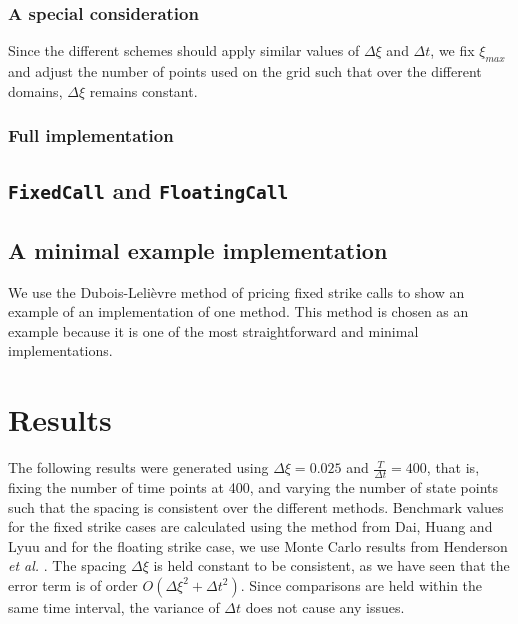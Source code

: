 \documentclass{article}
\begin{document}
\subsubsection{A special consideration}
Since the different schemes should apply similar values of \(\Delta\xi\) and \(\Delta t\), we fix \(\xi_{max}\) and adjust the number of points used on the grid such that over the different domains, \(\Delta\xi\) remains constant.

\subsubsection{Full implementation}
\scriptsize

\normalsize

\subsection{\texttt{FixedCall} and \texttt{FloatingCall}}

\scriptsize

\normalsize

\scriptsize

\normalsize

\subsection{A minimal example implementation}

We use the Dubois-Leli\`{e}vre method of pricing fixed strike calls to show an example of an implementation of one method. This method is chosen as an example because it is one of the most straightforward and minimal implementations.
\scriptsize

\normalsize

\section{Results}
The following results were generated using \(\Delta\xi = 0.025\) and \(\frac{T}{\Delta t} = 400\), that is, fixing the number of time points at 400, and varying the number of state points such that the spacing is consistent over the different methods. Benchmark values for the fixed strike cases are calculated using the method from Dai, Huang and Lyuu \cite{dai_et_al} and for the floating strike case, we use Monte Carlo results from Henderson \textit{et al.} \cite{henderson_et_al}. The spacing \(\Delta\xi\) is held constant to be consistent, as we have seen that the error term is of order \(O(\Delta\xi^2 + \Delta t^2)\). Since comparisons are held within the same time interval, the variance of \(\Delta t\) does not cause any issues.
\end{document}
